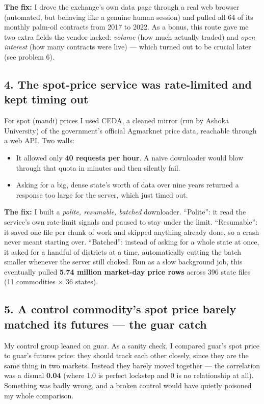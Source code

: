 \documentclass[11pt]{article}
\begin{document}
\textbf{The fix:} I drove the exchange's own data page through a real web browser (automated, but behaving like a genuine human session) and pulled all 64 of its monthly palm-oil contracts from 2017 to 2022. As a bonus, this route gave me two extra fields the vendor lacked: \emph{volume} (how much actually traded) and \emph{open interest} (how many contracts were live) --- which turned out to be crucial later (see problem 6).

\subsection*{4. The spot-price service was rate-limited and kept timing out}

For spot (mandi) prices I used CEDA, a cleaned mirror (run by Ashoka University) of the government's official Agmarknet price data, reachable through a web API. Two walls:

\begin{itemize}[leftmargin=1.4em]
  \item It allowed only \textbf{40 requests per hour}. A naive downloader would blow through that quota in minutes and then silently fail.
  \item Asking for a big, dense state's worth of data over nine years returned a response too large for the server, which just timed out.
\end{itemize}

\textbf{The fix:} I built a \emph{polite, resumable, batched} downloader. ``Polite'': it read the service's own rate-limit signals and paused to stay under the limit. ``Resumable'': it saved one file per chunk of work and skipped anything already done, so a crash never meant starting over. ``Batched'': instead of asking for a whole state at once, it asked for a handful of districts at a time, automatically cutting the batch smaller whenever the server still choked. Run as a slow background job, this eventually pulled \textbf{5.74 million market-day price rows} across 396 state files (11 commodities $\times$ 36 states).

\subsection*{5. A control commodity's spot price barely matched its futures --- the guar catch}

My control group leaned on guar. As a sanity check, I compared guar's spot price to guar's futures price: they should track each other closely, since they are the same thing in two markets. Instead they barely moved together --- the correlation was a dismal \textbf{0.04} (where 1.0 is perfect lockstep and 0 is no relationship at all). Something was badly wrong, and a broken control would have quietly poisoned my whole comparison.
\end{document}
